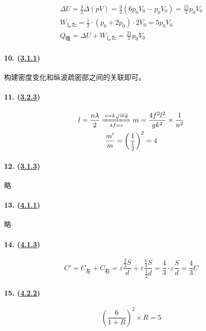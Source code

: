 \begin{gather*}
    \Delta U=\frac32\Delta(pV)=\frac32(6p_0V_0-p_0V_0)=\frac{15}{2}p_0V_0\\
    W_\textrm{した}=\frac12\cdot(p_0+2p_0)\cdot2V_0=5p_0V_0\\
    Q_\textrm{吸}=\Delta U+W_\textrm{した}=\frac{21}{2}p_0V_0
\end{gather*}

\paragraph{10. (\hyperref[subsec:1.3.1]{3.1.1})} 构建密度变化和纵波疏密部之间的关联即可。
\paragraph{11. (\hyperref[subsec:3.2.3]{3.2.3})}

\begin{gather*}
    l=\frac{n\lambda}{2}
    \xLongrightarrow[\lambda f=v]{v=k\sqrt{mg}}
    m=\frac{4f^2l^2}{gk^2}\times\frac{1}{n^2}\\
    \frac{m'}{m}=\left(\frac{1}{\frac12}\right)^2=4
\end{gather*}

\paragraph{12. (\hyperref[subsec:3.1.3]{3.1.3})} 略
\paragraph{13. (\hyperref[subsec:4.1.1]{4.1.1})} 略
\paragraph{14. (\hyperref[subsec:4.1.3]{4.1.3})}

\begin{equation*}
    C'=C_\textrm{左}+C_\textrm{右}
    =\varepsilon\frac{\frac23S}{d}+\varepsilon\frac{\frac13S}{\frac12d}
    =\frac43\cdot\varepsilon\frac Sd
    =\frac43C
\end{equation*}

\paragraph{15. (\hyperref[subsec:4.2.2]{4.2.2})}

\begin{equation*}
    \left(\frac{6}{1+R}\right)^2\times R=5
\end{equation*}

